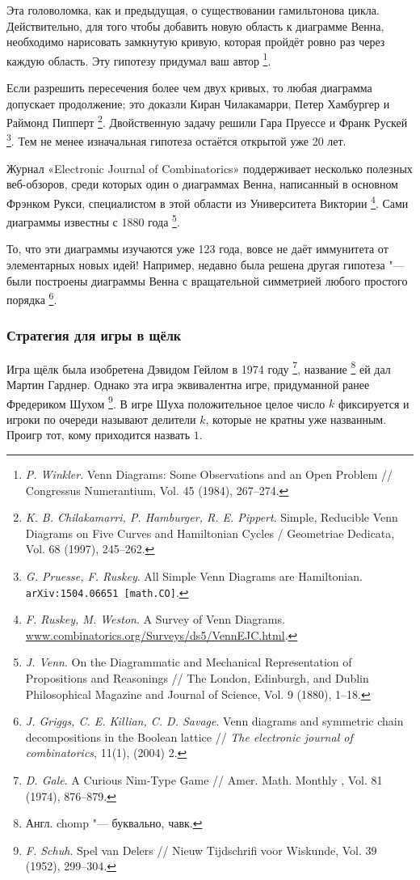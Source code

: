 \documentclass[twoside]{book}
\begin{document}
Эта головоломка, как и предыдущая, о существовании гамильтонова цикла. 
Действительно, для того чтобы добавить новую область к диаграмме Венна, необходимо нарисовать замкнутую кривую, которая пройдёт ровно раз через каждую область.
Эту гипотезу придумал ваш автор%
\footnote{\emph{P. Winkler}. Venn Diagrams: Some Observations and an Open Problem /\!/ {Congressus Numerantium}, Vol. 45 (1984), 267--274.}.

Если разрешить пересечения более чем двух кривых, то любая диаграмма допускает продолжение; это доказли Киран Чилакамарри, Петер Хамбургер и Раймонд Пипперт%
\footnote{\emph{K. B. Chilakamarri, P. Hamburger, R. E. Pippert}.
Simple, Reducible Venn Diagrams on Five Curves and Hamiltonian Cycles /\! {Geometriae Dedicata}, Vol. 68 (1997), 245--262.}.
Двойственную задачу решили Гара Пруессе и Франк Рускей%
\footnote{\emph{G. Pruesse, F. Ruskey}.
All Simple Venn Diagrams are Hamiltonian.
\texttt{arXiv:1504.06651 [math.CO]}.}.
Тем не менее изначальная гипотеза остаётся открытой уже 20 лет.

Журнал «Electronic Journal of Combinatorics» поддерживает не\-сколь\-ко полезных веб-обзоров, среди которых один о диаграммах Венна, написанный в основном Фрэнком Рукси, специалистом в этой области из Университета Виктории%
\footnote{\emph{F. Ruskey, M. Weston}. {A Survey of Venn Diagrams}. \href{http://www.combinatorics.org/Surveys/ds5/VennEJC.html}{\url{www.combinatorics.org/Surveys/ds5/VennEJC.html}}.}.
Сами диаграммы известны с 1880 года%
\footnote{\emph{J. Venn}.
On the Diagrammatic and Mechanical Representation of Propositions and Reasonings /\!/ {The London, Edinburgh, and Dublin Philosophical Magazine and Journal of Science}, Vol. 9 (1880),  1--18.}.



То, что эти диаграммы изучаются уже 123 года, вовсе не даёт иммунитета от элементарных новых идей!
Например, недавно была решена другая гипотеза "--- были построены диаграммы Венна с вращательной симметрией любого простого порядка%
\footnote{\emph{J. Griggs, C. E. Killian, C. D. Savage}. Venn diagrams and symmetric chain decom\-po\-si\-tions in the Boolean lattice /\!/
\emph{The electronic journal of combinatorics}, 11(1), (2004) 2.}.

\subsubsection*{Стратегия для игры в щёлк}

Игра щёлк была изобретена Дэвидом Гейлом в 1974 году%
\footnote{\emph{D. Gale}. A Curious Nim-Type Game /\!/ {Amer. Math. Monthly }, Vol. 81 (1974), 876--879.},
 название%
\footnote{Англ. chomp "--- буквально, чавк.}
 ей дал Мартин Гарднер.
Однако эта игра эквивалентна игре, придуманной ранее Фредериком Шухом%
\footnote{\emph{F. Schuh}. Spel van Delers /\!/ {Nieuw Tijdschrifi voor Wiskunde}, Vol. 39 (1952), 299--304.}.
В игре Шуха положительное целое число $k$ фиксируется и игроки по очереди называют делители  $k$, которые не кратны уже названным.
Проигр тот, кому приходится назвать $1$.
\end{document}
